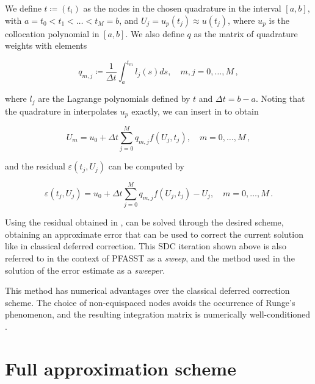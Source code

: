 We define \(t \coloneqq (t_i)\) as the nodes in the chosen quadrature in the interval \([a,b]\), with \(a = t_0 < t_1 < \ldots < t_M = b\), and \(U_j = u_p(t_j) \approx u(t_j)\), where \(u_p\) is the collocation polynomial in \([a,b]\). We also define \(q\) as the matrix of quadrature weights with elements

\begin{equation}
    q_{m,j} \coloneqq
    \frac{1}{\Delta t}
    \int^{t_m}_a l_j(s)ds, \quad m,j=0,\ldots,M\,,
    \label{eq:quadrature_q}
\end{equation}

where \(l_j\) are the Lagrange polynomials defined by \(t\) and \(\Delta t=b-a\). Noting that the quadrature in  interpolates \(u_p\) exactly, we can insert  in  to obtain

\begin{equation}
    U_m = u_0 + \Delta t 
    \sum_{j=0}^M q_{m,j} f(U_j, t_j), \quad m=0,\ldots,M\,,
    \label{eq:sdc_element}
\end{equation}

and the residual \(\varepsilon(t_j,U_j)\) can be computed by

\begin{equation}
    \varepsilon(t_j,U_j) = u_0 + \Delta t 
    \sum_{j=0}^M q_{m,j} f(U_j, t_j) - U_j, \quad m=0,\ldots,M\,.
    \label{eq:sdc_element_residual}
\end{equation}

Using the residual obtained in ,  can be solved through the desired scheme, obtaining an approximate error that can be used to correct the current solution like in classical deferred correction. This SDC iteration shown above is also referred to in the context of PFASST as a \textit{sweep}, and the method used in the solution of the error estimate as a \textit{sweeper}.

This method has numerical advantages over the classical deferred correction scheme. The choice of non-equispaced nodes avoids the occurrence of Runge's phenomenon, and the resulting integration matrix is numerically well-conditioned \cite{dutt2000spectral}.

\section{Full approximation scheme} \label{sec:fas}

